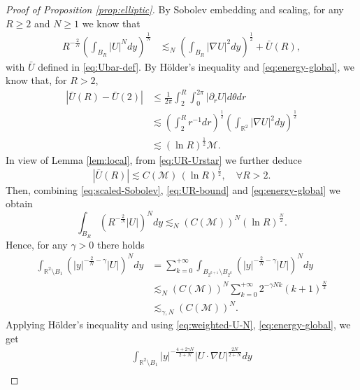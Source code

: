 \documentclass[12pt,reqno]{amsart}
\theoremstyle{plain}
\theoremstyle{definition}
\newcommand{\R}{\mathbb{R}}
\newcommand{\M}{\mathcal{M}}
\renewcommand{\:}{\colon}
\numberwithin{equation}{section}
\numberwithin{figure}{section}
\begin{document}
\begin{proof}[Proof of Proposition \ref{prop:elliptic}]
   
    By Sobolev embedding and scaling,  for any $R \ge 2$ and $N \ge 1$ we know that
    \begin{align} \label{eq:scaled-Sobolev}
        R^{-\frac{2}{N}}\left( \int_{B_R} |U|^{N} dy \right)^\frac{1}{N} &\lesssim_N \left(\int_{B_R} |\nabla U|^2 dy\right)^\frac12 + \bar{U}(R), 
    \end{align}
    with $\bar{U}$ defined in \eqref{eq:Ubar-def}.   By H\"older's inequality and \eqref{eq:energy-global}, we know that, for $R > 2$,
    \begin{align} \label{eq:UR-Urstar}
        |\bar{U}(R) - \bar{U}(2)| &\le \frac{1}{2\pi}  \int_{2}^R \int_0^{2\pi} |\partial_r  U| d\theta dr \nonumber \\
        &\lesssim \left( \int_{2}^R r^{-1} dr \right)^\frac12 \left( \int_{\R^2} |\nabla U|^2 dy \right)^\frac12  \nonumber \\
        &\lesssim  (\ln R)^\frac12 \M.
    \end{align}
    In view of Lemma \ref{lem:local}, from \eqref{eq:UR-Urstar} we further deduce
    \begin{equation} \label{eq:UR-bound}
        |\bar{U}(R)| \lesssim C(\M) \, (\ln R)^\frac12, \quad \forall R>2.
    \end{equation}
    Then, combining \eqref{eq:scaled-Sobolev}, \eqref{eq:UR-bound} and \eqref{eq:energy-global} we obtain
    \begin{equation} \label{eq:BR-UN}
        \int_{B_R} (R^{-\frac{2}{N}} |U|)^{N} dy \lesssim_N (C(\M))^N (\ln R)^{\frac{N}{2}}. 
    \end{equation}
    Hence, for any  $\gamma>0$ there holds
    \begin{align} \label{eq:weighted-U-N}
        \int_{\R^2 \setminus B_{1}} \left(|y|^{-\frac{2}{N} - \gamma} |U|\right)^N dy &= \sum_{k=0}^{+\infty} \int_{B_{2^{k+1}} \setminus B_{2^k}} \left(|y|^{-\frac{2}{N} - \gamma} |U|\right)^N dy \nonumber \\
        &\lesssim_{N} (C(\M))^N \sum_{k=0}^{+\infty} 2^{-\gamma N k} (k+1)^{\frac{N}{2}}   \nonumber  \\
        &\lesssim_{\gamma, N} (C(\M))^N.
    \end{align}
    Applying H\"older's inequality and using \eqref{eq:weighted-U-N}, \eqref{eq:energy-global}, we get
    \begin{align} \label{eq:mu-N-bound}
        &\quad \ \int_{\R^2 \setminus B_{1}} |y|^{-\frac{4+2\gamma N}{2+N}}|U \cdot \nabla U|^{\frac{2N}{2+N}} dy \nonumber \\

\end{align}
\end{proof}
\end{document}
